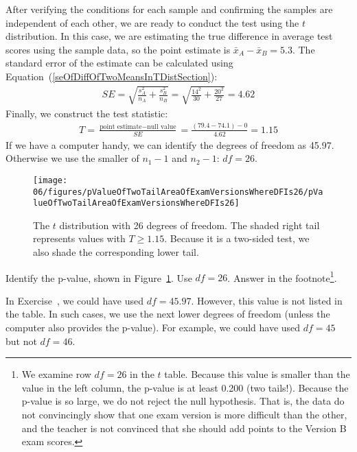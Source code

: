 After verifying the conditions for each sample and confirming the samples are independent of each other, we are ready to conduct the test using the $t$ distribution. In this case, we are estimating the true difference in average test scores using the sample data, so the point estimate is $\bar{x}_A - \bar{x}_B = 5.3$. The standard error of the estimate can be calculated using Equation~(\ref{seOfDiffOfTwoMeansInTDistSection}):
\begin{eqnarray*}
SE = \sqrt{\frac{s_A^2}{n_A} + \frac{s_B^2}{n_B}} = \sqrt{\frac{14^2}{30} + \frac{20^2}{27}} = 4.62
\end{eqnarray*}
Finally, we construct the test statistic:
\begin{eqnarray*}
T = \frac{\text{point estimate} - \text{null value}}{SE} = \frac{(79.4-74.1) - 0}{4.62} = 1.15
\end{eqnarray*}
If we have a computer handy, we can identify the degrees of freedom as 45.97. Otherwise we use the smaller of $n_1-1$ and $n_2-1$: $df=26$. 
\begin{figure}
\centering
\texttt{[image: 06/figures/pValueOfTwoTailAreaOfExamVersionsWhereDFIs26/pValueOfTwoTailAreaOfExamVersionsWhereDFIs26]}
\caption{The $t$ distribution with 26 degrees of freedom. The shaded right tail represents values with $T \geq 1.15$. Because it is a two-sided test, we also shade the corresponding lower tail.}
\label{pValueOfTwoTailAreaOfExamVersionsWhereDFIs26}
\end{figure}

\begin{exercise} \label{computeTwoTailAreaOfExamVersionsWhereDFIs26}
Identify the p-value, shown in Figure~\ref{pValueOfTwoTailAreaOfExamVersionsWhereDFIs26}. Use $df=26$. Answer in the footnote\footnote{We examine row $df=26$ in the $t$ table. Because this value is smaller than the value in the left column, the p-value is at least 0.200 (two tails!). Because the p-value is so large, we do not reject the null hypothesis. That is, the data do not convincingly show that one exam version is more difficult than the other, and the teacher is not convinced that she should add points to the Version B exam scores.}.
\end{exercise}

In Exercise~, we could have used $df=45.97$. However, this value is not listed in the table. In such cases, we use the next lower degrees of freedom (unless the computer also provides the p-value). For example, we could have used $df=45$ but not $df=46$. 

